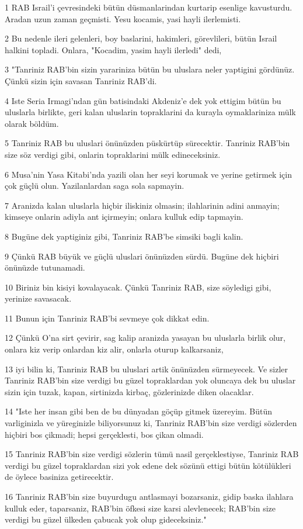 \par 1 RAB Israil'i çevresindeki bütün düsmanlarindan kurtarip esenlige kavusturdu. Aradan uzun zaman geçmisti. Yesu kocamis, yasi hayli ilerlemisti.
\par 2 Bu nedenle ileri gelenleri, boy baslarini, hakimleri, görevlileri, bütün Israil halkini topladi. Onlara, "Kocadim, yasim hayli ilerledi" dedi,
\par 3 "Tanriniz RAB'bin sizin yarariniza bütün bu uluslara neler yaptigini gördünüz. Çünkü sizin için savasan Tanriniz RAB'di.
\par 4 Iste Seria Irmagi'ndan gün batisindaki Akdeniz'e dek yok ettigim bütün bu uluslarla birlikte, geri kalan uluslarin topraklarini da kurayla oymaklariniza mülk olarak böldüm.
\par 5 Tanriniz RAB bu uluslari önünüzden püskürtüp sürecektir. Tanriniz RAB'bin size söz verdigi gibi, onlarin topraklarini mülk edineceksiniz.
\par 6 Musa'nin Yasa Kitabi'nda yazili olan her seyi korumak ve yerine getirmek için çok güçlü olun. Yazilanlardan saga sola sapmayin.
\par 7 Aranizda kalan uluslarla hiçbir iliskiniz olmasin; ilahlarinin adini anmayin; kimseye onlarin adiyla ant içirmeyin; onlara kulluk edip tapmayin.
\par 8 Bugüne dek yaptiginiz gibi, Tanriniz RAB'be simsiki bagli kalin.
\par 9 Çünkü RAB büyük ve güçlü uluslari önünüzden sürdü. Bugüne dek hiçbiri önünüzde tutunamadi.
\par 10 Biriniz bin kisiyi kovalayacak. Çünkü Tanriniz RAB, size söyledigi gibi, yerinize savasacak.
\par 11 Bunun için Tanriniz RAB'bi sevmeye çok dikkat edin.
\par 12 Çünkü O'na sirt çevirir, sag kalip aranizda yasayan bu uluslarla birlik olur, onlara kiz verip onlardan kiz alir, onlarla oturup kalkarsaniz,
\par 13 iyi bilin ki, Tanriniz RAB bu uluslari artik önünüzden sürmeyecek. Ve sizler Tanriniz RAB'bin size verdigi bu güzel topraklardan yok oluncaya dek bu uluslar sizin için tuzak, kapan, sirtinizda kirbaç, gözlerinizde diken olacaklar.
\par 14 "Iste her insan gibi ben de bu dünyadan göçüp gitmek üzereyim. Bütün varliginizla ve yüreginizle biliyorsunuz ki, Tanriniz RAB'bin size verdigi sözlerden hiçbiri bos çikmadi; hepsi gerçeklesti, bos çikan olmadi.
\par 15 Tanriniz RAB'bin size verdigi sözlerin tümü nasil gerçeklestiyse, Tanriniz RAB verdigi bu güzel topraklardan sizi yok edene dek sözünü ettigi bütün kötülükleri de öylece basiniza getirecektir.
\par 16 Tanriniz RAB'bin size buyurdugu antlasmayi bozarsaniz, gidip baska ilahlara kulluk eder, taparsaniz, RAB'bin öfkesi size karsi alevlenecek; RAB'bin size verdigi bu güzel ülkeden çabucak yok olup gideceksiniz."

